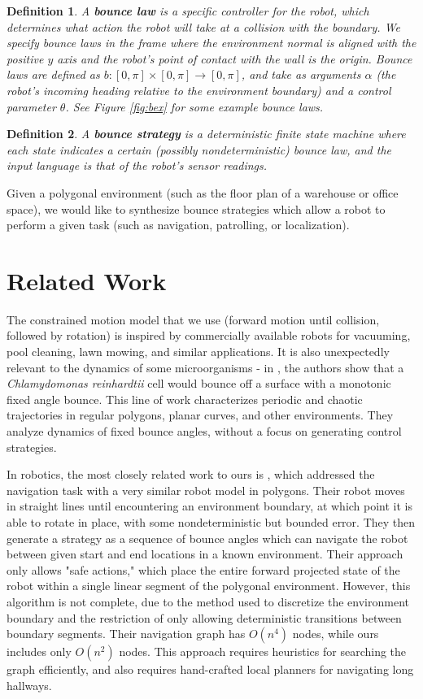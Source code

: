 \documentclass[]{article}  %
\newtheorem{definition}{\bf Definition}
\begin{document}
\begin{definition}
A \textbf{bounce law} is a specific controller for the robot, which determines
what action the robot will take at a collision with the boundary.
We specify 
bounce laws in the
frame where the environment normal is aligned with the positive $y$ axis and the
robot's point of contact with the wall is the origin.  
Bounce laws are defined as $b: [0,\pi] \times [0,\pi] \to [0,\pi]$, and take as
arguments $\alpha$ (the robot's incoming heading relative to the environment
boundary) and a control parameter $\theta$. See Figure \ref{fig:bex} for some
example bounce laws. 
\end{definition}

\begin{definition}
A \textbf{bounce strategy} is a deterministic finite state machine where each
state indicates a certain (possibly nondeterministic) bounce law, and the input language is that of the
robot's sensor readings.
\end{definition}

Given a polygonal environment (such as the floor plan of a warehouse or office
space), we would like to synthesize bounce strategies which allow a robot to
perform a given task (such as navigation, patrolling, or localization).

\section{Related Work}

The constrained motion model that we use (forward motion until collision,
followed by rotation) is inspired by commercially available robots
for vacuuming, pool cleaning, lawn mowing, and similar applications. It is also
unexpectedly relevant to the dynamics of some microorganisms - in \cite{microorganism2017}, the authors show that a
\textit{Chlamydomonas reinhardtii} cell would bounce off a surface with a
monotonic fixed angle bounce. This line of work characterizes periodic and
chaotic trajectories in regular polygons, planar curves, and other environments.
They analyze dynamics of fixed bounce angles, without a focus on generating control
strategies.

In robotics, the most closely related work to ours is \cite{LewOKa13}, which addressed 
the navigation task with a very similar robot
model in polygons. Their robot moves in straight lines until encountering an environment
boundary, at which point it is able to rotate in place, with some nondeterministic but
bounded error. They then generate a strategy as a sequence of bounce angles which can 
navigate the robot between given start and end locations in a known environment. Their approach only allows "safe actions," which place
the entire forward projected state of the robot within a single
linear segment of the polygonal environment. However, this algorithm is
not complete, due to the method used to discretize the environment boundary and
the restriction of only allowing deterministic transitions between boundary
segments. Their navigation graph has $O(n^4)$ nodes, while ours includes only $O(n^2)$
nodes. This approach requires heuristics for searching the graph efficiently,
and also requires hand-crafted local planners for navigating long hallways.
\end{document}
